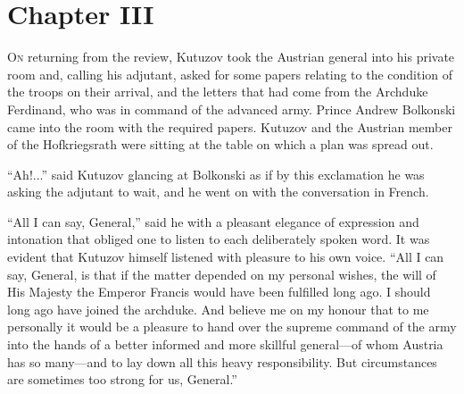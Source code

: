 
\chapter*{Chapter III}

\ifaudio     {} \fi

\lettrine[lines=2, loversize=0.3, lraise=0]{\initfamily O}{n}
returning from the review, Kutuzov took the Austrian general
into his private room and, calling his adjutant, asked for some
papers relating to the condition of the troops on their arrival,
and the letters that had come from the Archduke Ferdinand, who
was in command of the advanced army. Prince Andrew Bolkonski came
into the room with the required papers. Kutuzov and the Austrian
member of the Hofkriegsrath were sitting at the table on which a
plan was spread out.

``Ah!...'' said Kutuzov glancing at Bolkonski as if by this
exclamation he was asking the adjutant to wait, and he went on
with the conversation in French.

``All I can say, General,'' said he with a pleasant elegance of
expression and intonation that obliged one to listen to each
deliberately spoken word. It was evident that Kutuzov himself
listened with pleasure to his own voice. ``All I can say,
General, is that if the matter depended on my personal wishes,
the will of His Majesty the Emperor Francis would have been
fulfilled long ago. I should long ago have joined the
archduke. And believe me on my honour that to me personally it
would be a pleasure to hand over the supreme command of the army
into the hands of a better informed and more skillful
general---of whom Austria has so many---and to lay down all this
heavy responsibility. But circumstances are sometimes too strong
for us, General.''

